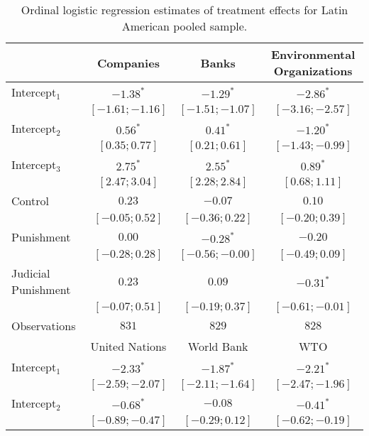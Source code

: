 \begin{table}[h]
\begin{center}
\caption{Ordinal logistic regression estimates of treatment effects for Latin American pooled sample.}
\begin{threeparttable}
\begin{tabular}{l c c c}
\hline
 & Companies & Banks & Environmental
Organizations \\
\hline
Intercept$_1$       & $-1.38^{*}$       & $-1.29^{*}$       & $-2.86^{*}$       \\
                    & $ [-1.61; -1.16]$ & $ [-1.51; -1.07]$ & $ [-3.16; -2.57]$ \\
Intercept$_2$       & $0.56^{*}$        & $0.41^{*}$        & $-1.20^{*}$       \\
                    & $ [ 0.35;  0.77]$ & $ [ 0.21;  0.61]$ & $ [-1.43; -0.99]$ \\
Intercept$_3$       & $2.75^{*}$        & $2.55^{*}$        & $0.89^{*}$        \\
                    & $ [ 2.47;  3.04]$ & $ [ 2.28;  2.84]$ & $ [ 0.68;  1.11]$ \\
Control             & $0.23$            & $-0.07$           & $0.10$            \\
                    & $ [-0.05;  0.52]$ & $ [-0.36;  0.22]$ & $ [-0.20;  0.39]$ \\
Punishment          & $0.00$            & $-0.28^{*}$       & $-0.20$           \\
                    & $ [-0.28;  0.28]$ & $ [-0.56; -0.00]$ & $ [-0.49;  0.09]$ \\
Judicial Punishment & $0.23$            & $0.09$            & $-0.31^{*}$       \\
                    & $ [-0.07;  0.51]$ & $ [-0.19;  0.37]$ & $ [-0.61; -0.01]$ \\
\hline
Observations        & $831$             & $829$             & $828$             \\
\hline
 & United Nations & World Bank & WTO \\
\hline
Intercept$_1$       & $-2.33^{*}$       & $-1.87^{*}$       & $-2.21^{*}$       \\
                    & $ [-2.59; -2.07]$ & $ [-2.11; -1.64]$ & $ [-2.47; -1.96]$ \\
Intercept$_2$       & $-0.68^{*}$       & $-0.08$           & $-0.41^{*}$       \\
                    & $ [-0.89; -0.47]$ & $ [-0.29;  0.12]$ & $ [-0.62; -0.19]$ \\

\end{tabular}
\end{threeparttable}
\end{center}
\end{table}
